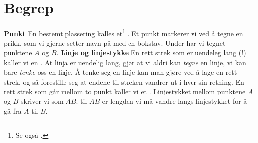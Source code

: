





\newpage
\section{Begrep}
\textbf{Punkt}\os
En bestemt plassering kalles et\footnote{Se også .} . Et punkt markerer vi ved å tegne en prikk, som vi gjerne setter navn på med en bokstav. Under har vi tegnet punktene $ A $ og $ B $.
\textbf{Linje og linjestykke}\os
En rett strek som er uendeleg lang (!) kaller vi en . At linja er uendelig lang, gjør at vi aldri kan \textsl{tegne} en linje, vi kan bare \textsl{tenke} oss en linje. Å tenke seg en linje kan man gjøre ved å lage en rett strek, og så forestille seg at endene til streken vandrer ut i hver sin retning.
En rett strek som går mellom to punkt kaller vi et .
Linjestykket mellom punktene $ A $ og $ B $ skriver vi som $ AB $.  til $ AB $ er lengden vi må vandre langs linjestykket for å gå fra $ A $ til $ B $. \regv

